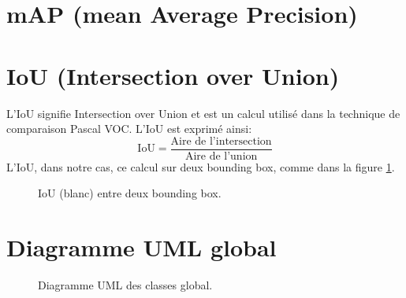 \begin{appendices}
	
	\section*{mAP (mean Average Precision)}\label{appendix:mAP}
	
	\section*{IoU (Intersection over Union)}\label{appendix:IoU}
	L'IoU signifie Intersection over Union et est un calcul utilisé dans la technique de comparaison Pascal VOC.
	L'IoU est exprimé ainsi:
	$$\text{IoU} = \frac{\text{Aire de l'intersection}}{\text{Aire de l'union}}$$
	L'IoU, dans notre cas, ce calcul sur deux bounding box, comme dans la figure \ref{fig:iou_example}.
	\begin{figure}[!htbp]
	\center
	\caption{IoU (blanc) entre deux bounding box.}
	\label{fig:iou_example}
	\end{figure}
	\FloatBarrier
	
	\section*{Diagramme UML global}\label{appendix:UMLGlobal}
	\begin{figure}[!htbp]
		\center
		\caption{Diagramme UML des classes global.}
		\label{fig:uml_diagram_classes}
	\end{figure}
	\FloatBarrier
	
\end{appendices}

\clearpage